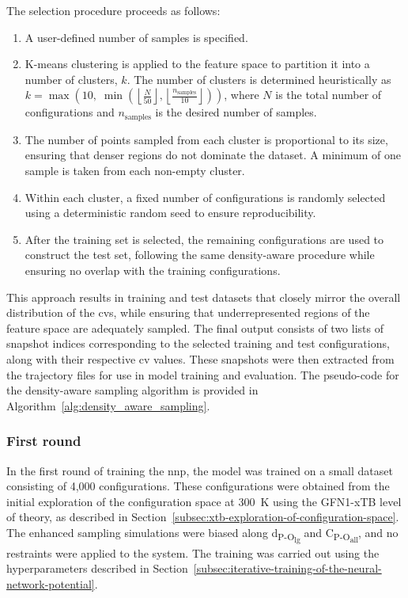 The selection procedure proceeds as follows:
\begin{enumerate}
    \item A user-defined number of samples is specified.
    \item K-means clustering is applied to the feature space to partition it into a number of clusters, $k$. The number of clusters is determined heuristically as $k = \max\left(10, \; \min\left(\left\lfloor \frac{N}{50} \right\rfloor, \left\lfloor \frac{n_\text{samples}}{10} \right\rfloor \right)\right)$, where $N$ is the total number of configurations and $n_\text{samples}$ is the desired number of samples.
    \item The number of points sampled from each cluster is proportional to its size, ensuring that denser regions do not dominate the dataset. A minimum of one sample is taken from each non-empty cluster.
    \item Within each cluster, a fixed number of configurations is randomly selected using a deterministic random seed to ensure reproducibility.
    \item After the training set is selected, the remaining configurations are used to construct the test set, following the same density-aware procedure while ensuring no overlap with the training configurations.
\end{enumerate}

This approach results in training and test datasets that closely mirror the overall distribution of the \acp{cv}, while ensuring that underrepresented regions of the feature space are adequately sampled. The final output consists of two lists of snapshot indices corresponding to the selected training and test configurations, along with their respective \ac{cv} values. These snapshots were then extracted from the trajectory files for use in model training and evaluation. The pseudo-code for the density-aware sampling algorithm is provided in Algorithm~\ref{alg:density_aware_sampling}.



\subsubsection{First round}
In the first round of training the \ac{nnp}, the model was trained on a small dataset consisting of 4,000 configurations. These configurations were obtained from the initial exploration of the configuration space at 300~K using the GFN1-xTB level of theory, as described in Section~\ref{subsec:xtb-exploration-of-configuration-space}. The enhanced sampling simulations were biased along d\textsubscript{P-O\textsubscript{lg}} and C\textsubscript{P-O\textsubscript{all}}, and no restraints were applied to the system. The training was carried out using the hyperparameters described in Section~\ref{subsec:iterative-training-of-the-neural-network-potential}.



